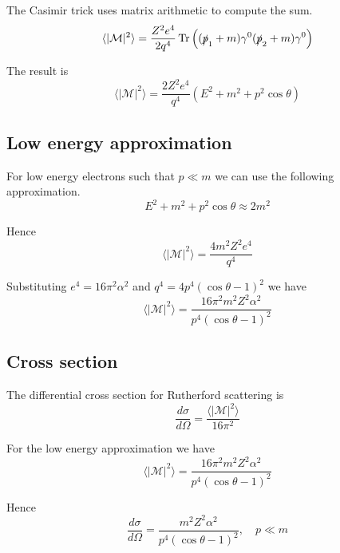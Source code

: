\documentclass[12pt]{article}
\begin{document}
The Casimir trick uses matrix arithmetic to compute the sum.
\begin{equation*}
\langle\vert\mathcal{M}\vert^2\rangle
=\frac{Z^2e^4}{2q^4}\mathop{\rm Tr}\left((\slashed{p}_1+m)\gamma^0(\slashed{p}_2+m)\gamma^0\right)
\end{equation*}

The result is
\begin{equation*}
\langle\vert\mathcal{M}\vert^2\rangle
=\frac{2Z^2e^4}{q^4}\left(E^2+m^2+p^2\cos\theta\right)
\end{equation*}

\subsection*{Low energy approximation}
For low energy electrons such that $p\ll m$ we can use the following approximation.
\begin{equation*}
E^2+m^2+p^2\cos\theta\approx2m^2
\end{equation*}

Hence
\begin{equation*}
\langle|\mathcal{M}|^2\rangle=\frac{4m^2Z^2e^4}{q^4}
\end{equation*}

Substituting $e^4=16\pi^2\alpha^2$ and $q^4=4p^4(\cos\theta-1)^2$ we have
\begin{equation*}
\langle|\mathcal{M}|^2\rangle=\frac{16\pi^2m^2Z^2\alpha^2}{p^4(\cos\theta-1)^2}
\end{equation*}

\subsection*{Cross section}
The differential cross section for Rutherford scattering is
\begin{equation*}
\frac{d\sigma}{d\Omega}=\frac{\langle|\mathcal{M}|^2\rangle}{16\pi^2}
\end{equation*}

For the low energy approximation we have
\begin{equation*}
\langle|\mathcal{M}|^2\rangle=\frac{16\pi^2m^2Z^2\alpha^2}{p^4(\cos\theta-1)^2}
\end{equation*}

Hence
\begin{equation*}
\frac{d\sigma}{d\Omega}=\frac{m^2Z^2\alpha^2}{p^4(\cos\theta-1)^2},
\quad
p\ll m
\end{equation*}
\end{document}
